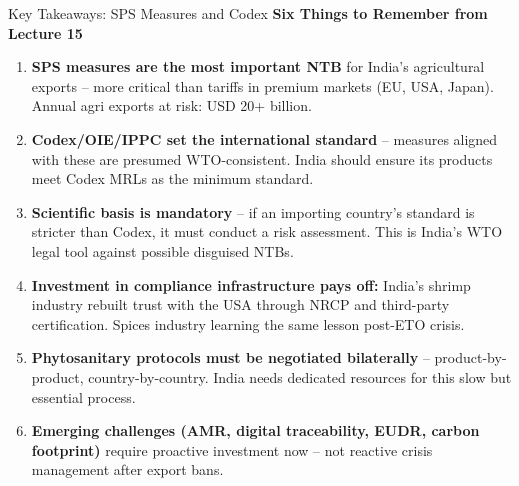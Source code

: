 \documentclass[
  ignorenonframetext,
  aspectratio=169,
]{beamer}
\makeatletter
\let\quarto@originallabel\label
\DeclareRobustCommand*{\label}[1]{\quarto@originallabel{#1}}
\makeatother
\begin{document}
\begin{frame}{Key Takeaways: SPS Measures and Codex}
\label{key-takeaways-sps-measures-and-codex}
\textbf{Six Things to Remember from Lecture 15}

\begin{enumerate}
\item
  \textbf{SPS measures are the most important NTB} for India's
  agricultural exports -- more critical than tariffs in premium markets
  (EU, USA, Japan). Annual agri exports at risk: USD 20+ billion.
\item
  \textbf{Codex/OIE/IPPC set the international standard} -- measures
  aligned with these are presumed WTO-consistent. India should ensure
  its products meet Codex MRLs as the minimum standard.
\item
  \textbf{Scientific basis is mandatory} -- if an importing country's
  standard is stricter than Codex, it must conduct a risk assessment.
  This is India's WTO legal tool against possible disguised NTBs.
\item
  \textbf{Investment in compliance infrastructure pays off:} India's
  shrimp industry rebuilt trust with the USA through NRCP and
  third-party certification. Spices industry learning the same lesson
  post-ETO crisis.
\item
  \textbf{Phytosanitary protocols must be negotiated bilaterally} --
  product-by-product, country-by-country. India needs dedicated
  resources for this slow but essential process.
\item
  \textbf{Emerging challenges (AMR, digital traceability, EUDR, carbon
  footprint)} require proactive investment now -- not reactive crisis
  management after export bans.
\end{enumerate}
\end{frame}
\end{document}

